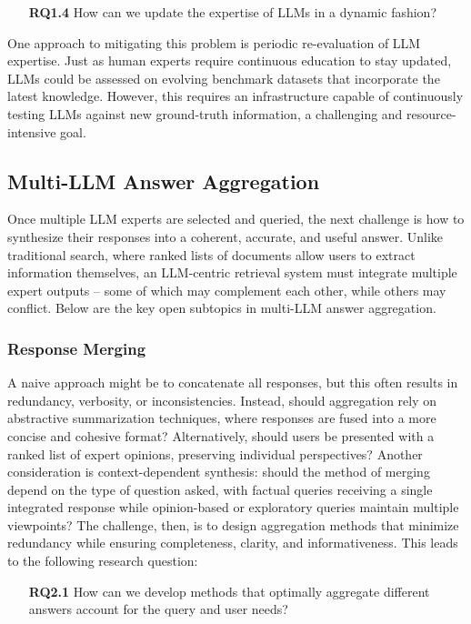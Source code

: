 \begin{itemize}
    \item [\textbf{RQ1.4}] How can we update the expertise of LLMs in a dynamic fashion?
\end{itemize}

One approach to mitigating this problem is periodic re-evaluation of LLM expertise. Just as human experts require continuous education to stay updated, LLMs could be assessed on evolving benchmark datasets that incorporate the latest knowledge. However, this requires an infrastructure capable of continuously testing LLMs against new ground-truth information, a challenging and resource-intensive goal. 

\subsection{Multi-LLM Answer Aggregation}
Once multiple LLM experts are selected and queried, the next challenge is how to synthesize their responses into a coherent, accurate, and useful answer. Unlike traditional search, where ranked lists of documents allow users to extract information themselves, an LLM-centric retrieval system must integrate multiple expert outputs -- some of which may complement each other, while others may conflict. Below are the key open subtopics in multi-LLM answer aggregation.

\subsubsection{Response Merging}

A naive approach might be to concatenate all responses, but this often results in redundancy, verbosity, or inconsistencies. Instead, should aggregation rely on abstractive summarization techniques, where responses are fused into a more concise and cohesive format? Alternatively, should users be presented with a ranked list of expert opinions, preserving individual perspectives? Another consideration is context-dependent synthesis: should the method of merging depend on the type of question asked, with factual queries receiving a single integrated response while opinion-based or exploratory queries maintain multiple viewpoints? The challenge, then, is to design aggregation methods that minimize redundancy while ensuring completeness, clarity, and informativeness. This leads to the following research question:

\begin{itemize}
    \item [\textbf{RQ2.1}] How can we develop methods that optimally aggregate different answers account for the query and user needs?
\end{itemize}

